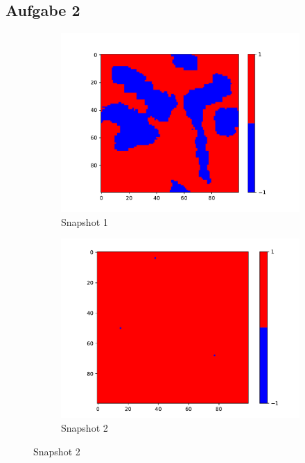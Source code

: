 \subsection{Aufgabe 2} 

\begin{figure}
    \centering
    \begin{subfigure}{0.45\textwidth}
      \centering
      \includegraphics[width=\linewidth]{images/Ising1_0.pdf}
      \caption{Snapshot 1}
      \label{fig:image1}
    \end{subfigure}
    \hfill
    \begin{subfigure}{0.45\textwidth}
      \centering
      \includegraphics[width=\linewidth]{images/Ising1_2.pdf}
      \caption{Snapshot 2}
      \label{fig:image2}
    \end{subfigure}
    

\end{figure}
